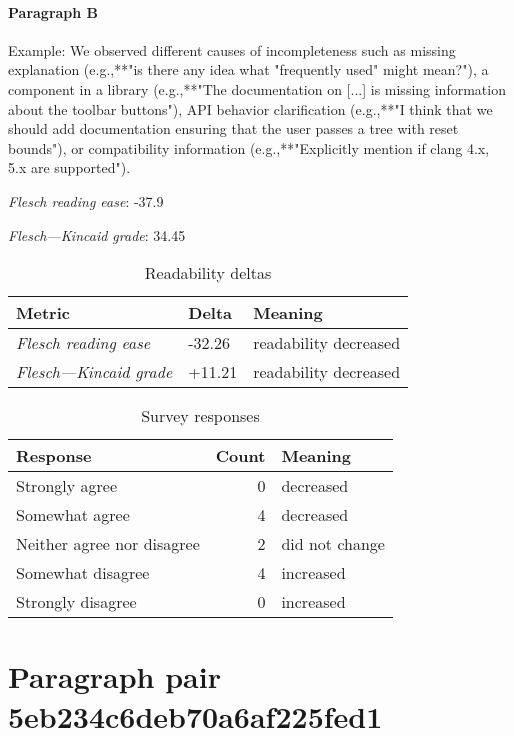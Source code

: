 \paragraph{Paragraph B}
Example: We observed different causes of incompleteness such as missing explanation (e.g.,**"is there any idea what "frequently used" might mean?"), a component in a library (e.g.,**"The documentation on [...] is missing information about the toolbar buttons"), API behavior clarification (e.g.,**"I think that we should add documentation ensuring that the user passes a tree with reset bounds"), or compatibility information (e.g.,**"Explicitly mention if clang 4.x, 5.x are supported").\par\medskip
\emph{Flesch reading ease}: -37.9\par
\emph{Flesch---Kincaid grade}: 34.45

\bigskip\begin{table}[!h]
\centering
\begin{tabular}{lll}
\toprule
               \textbf{Metric} & \textbf{Delta} &       \textbf{Meaning} \\
\midrule
    \emph{Flesch reading ease} &         -32.26 &  readability decreased \\
 \emph{Flesch---Kincaid grade} &         +11.21 &  readability decreased \\
\bottomrule
\end{tabular}
\caption*{Readability deltas}\end{table}

\begin{table}[!h]
\centering
\begin{tabular}{lrl}
\toprule
          \textbf{Response} &  \textbf{Count} & \textbf{Meaning} \\
\midrule
             Strongly agree &               0 &        decreased \\
             Somewhat agree &               4 &        decreased \\
 Neither agree nor disagree &               2 &   did not change \\
          Somewhat disagree &               4 &        increased \\
          Strongly disagree &               0 &        increased \\
\bottomrule
\end{tabular}
\caption*{Survey responses}\end{table}


\newpage
\section{Paragraph pair 5eb234c6deb70a6af225fed1}
